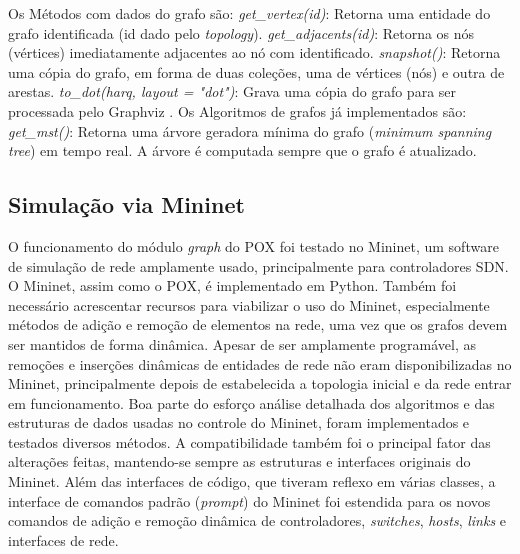 \begin{outline}
\0 Os Métodos com dados do grafo são:
    \1 \emph{get\_vertex(id)}:
    Retorna uma entidade do grafo identificada (id dado pelo \emph{topology}).
    \1 \emph{get\_adjacents(id)}: 
    Retorna os nós (vértices) imediatamente adjacentes ao nó com identificado.
    \1 \emph{snapshot()}: 
    Retorna uma cópia do grafo, em forma de duas coleções, 
    uma de vértices (nós) e outra de arestas.
    \1 \emph{to\_dot(harq, layout = "dot")}: 
    Grava uma cópia do grafo para ser processada pelo Graphviz
    \citep{john2003graphviz}.
\0 Os Algoritmos de grafos já implementados são:
    \1 \emph{get\_mst()}:
    Retorna uma árvore geradora mínima do grafo (\emph{minimum spanning tree})
    em tempo real. A árvore é computada sempre que o grafo é atualizado.
\end{outline}


\subsection{Simulação via Mininet}

O funcionamento do módulo \emph{graph} do POX foi testado no Mininet,
\citep{lantz2010network}
um software de simulação de rede amplamente usado, 
principalmente para controladores SDN.
O Mininet, assim como o POX, é implementado em Python.
Também foi necessário acrescentar recursos para viabilizar o uso do Mininet,
especialmente métodos de adição e remoção de elementos na rede,
uma vez que os grafos devem ser mantidos de forma dinâmica.
Apesar de ser amplamente programável, 
as remoções e inserções dinâmicas de entidades de rede 
não eram disponibilizadas no Mininet,
principalmente depois de estabelecida a topologia inicial 
e da rede entrar em funcionamento.
Boa parte do esforço  análise detalhada dos algoritmos e das estruturas de dados usadas 
no controle do Mininet, foram implementados e testados diversos métodos.
A compatibilidade também foi o principal fator das alterações feitas,
mantendo-se sempre as estruturas e interfaces originais do Mininet.
Além das interfaces de código, que tiveram reflexo em várias classes, 
a interface de comandos padrão (\emph{prompt}) do Mininet
foi estendida para os novos comandos de adição e remoção dinâmica de controladores,
 \emph{switches}, \emph{hosts}, \emph{links} e interfaces de rede.